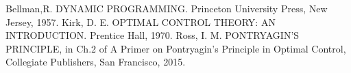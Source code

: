     \begin{thebibliography}{9}
        \bibitem{} Bellman,R. DYNAMIC PROGRAMMING. Princeton University Press, New Jersey, 1957.
        \bibitem{} Kirk, D. E. OPTIMAL CONTROL THEORY: AN INTRODUCTION. Prentice Hall, 1970.
        \bibitem{} Ross, I. M. PONTRYAGIN'S PRINCIPLE, in Ch.2 of A Primer on Pontryagin's Principle in Optimal Control, Collegiate Publishers, San Francisco, 2015.
    \end{thebibliography}



